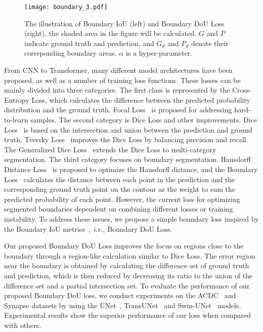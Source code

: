\documentclass[runningheads]{llncs}
\begin{document}
\begin{figure}[t]
\centering
\texttt{[image: boundary\_3.pdf]}
\caption{The illustration of Boundary IoU (left) and Boundary DoU Loss (right), the shaded area in the figure will be calculated. $G$ and $P$ indicate ground truth and prediction, and $G_d$ and $P_d$ denote their correponding boundary areas. $\alpha$ is a hyper-parameter.}
\label{fig:b-iou}
\end{figure}

From CNN to Transformer, many different model architectures have been proposed, as well as a number of training loss functions. These losses can be mainly divided into three categories. The first class is represented by the Cross-Entropy Loss, which calculates the difference between the predicted probability distribution and the ground truth. Focal Loss~\cite{lin2017focal} is proposed for addressing hard-to-learn samples. The second category is Dice Loss and other improvements. Dice Loss~\cite{milletari2016v} is based on the intersection and union between the prediction and ground truth. Tversky Loss~\cite{salehi2017tversky} improves the Dice Loss by balancing precision and recall. The Generalized Dice Loss~\cite{sudre2017generalised} extends the Dice Loss to multi-category segmentation. The third category focuses on boundary segmentation. Hausdorff Distance Loss~\cite{karimi2019reducing} is proposed to optimize the Hausdorff distance, and the Boundary Loss~\cite{kervadec2019boundary} calculates the distance between each point in the prediction and the corresponding ground truth point on the contour as the weight to sum the predicted probability of each point. However, the current loss for optimizing segmented boundaries dependent on combining different losses or training instability. To address these issues, we propose a simple boundary loss inspired by the Boundary IoU metrics~\cite{cheng2021boundary}, \textit{i.e.}, Boundary DoU Loss.

Our proposed Boundary DoU Loss improves the focus on regions close to the boundary through a region-like calculation similar to Dice Loss. The error region near the boundary is obtained by calculating the difference set of ground truth and prediction, which is then reduced by decreasing its ratio to the union of the difference set and a partial intersection set. To evaluate the performance of our proposed Boundary DoU loss, we conduct experiments on the ACDC~\cite{bernard2018deep} and Synapse datasets by using the UNet~\cite{ronneberger2015u}, TransUNet~\cite{chen2021transunet} and Swin-UNet~\cite{cao2021swin} models. Experimental results show the superior performance of our loss when compared with others.
\end{document}
